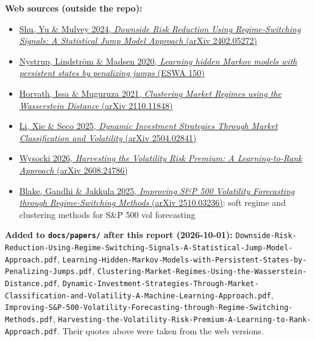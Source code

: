 \documentclass{article}
\begin{document}
\textbf{Web sources (outside the repo):}

\begin{itemize}

\item \href{https://arxiv.org/abs/2402.05272}{Shu, Yu \& Mulvey 2024, \emph{Downside Risk Reduction Using Regime-Switching Signals: A Statistical Jump Model Approach} (arXiv 2402.05272)}

\item \href{https://orbit.dtu.dk/en/publications/learning-hidden-markov-models-with-persistent-states-by-penalizin}{Nystrup, Lindström \& Madsen 2020, \emph{Learning hidden Markov models with persistent states by penalizing jumps} (ESWA 150)}

\item \href{https://arxiv.org/abs/2110.11848}{Horvath, Issa \& Muguruza 2021, \emph{Clustering Market Regimes using the Wasserstein Distance} (arXiv 2110.11848)}

\item \href{https://arxiv.org/abs/2504.02841}{Li, Xie \& Seco 2025, \emph{Dynamic Investment Strategies Through Market Classification and Volatility} (arXiv 2504.02841)}

\item \href{https://arxiv.org/abs/2608.24786}{Wysocki 2026, \emph{Harvesting the Volatility Risk Premium: A Learning-to-Rank Approach} (arXiv 2608.24786)}

\item \href{https://arxiv.org/abs/2510.03236}{Blake, Gandhi \& Jakkula 2025, \emph{Improving S\&P 500 Volatility Forecasting through Regime-Switching Methods} (arXiv 2510.03236)}: soft regime and clustering methods for S\&P 500 vol forecasting

\end{itemize}

\textbf{Added to \texttt{docs/\allowbreak{}papers/\allowbreak{}} after this report (2026-10-01):} \texttt{Downside-\allowbreak{}Risk-\allowbreak{}Reduction-\allowbreak{}Using-\allowbreak{}Regime-\allowbreak{}Switching-\allowbreak{}Signals-\allowbreak{}A-\allowbreak{}Statistical-\allowbreak{}Jump-\allowbreak{}Model-\allowbreak{}Approach.\allowbreak{}pdf}, \texttt{Learning-\allowbreak{}Hidden-\allowbreak{}Markov-\allowbreak{}Models-\allowbreak{}with-\allowbreak{}Persistent-\allowbreak{}States-\allowbreak{}by-\allowbreak{}Penalizing-\allowbreak{}Jumps.\allowbreak{}pdf}, \texttt{Clustering-\allowbreak{}Market-\allowbreak{}Regimes-\allowbreak{}Using-\allowbreak{}the-\allowbreak{}Wasserstein-\allowbreak{}Distance.\allowbreak{}pdf}, \texttt{Dynamic-\allowbreak{}Investment-\allowbreak{}Strategies-\allowbreak{}Through-\allowbreak{}Market-\allowbreak{}Classification-\allowbreak{}and-\allowbreak{}Volatility-\allowbreak{}A-\allowbreak{}Machine-\allowbreak{}Learning-\allowbreak{}Approach.\allowbreak{}pdf}, \texttt{Improving-\allowbreak{}S\&P-\allowbreak{}500-\allowbreak{}Volatility-\allowbreak{}Forecasting-\allowbreak{}through-\allowbreak{}Regime-\allowbreak{}Switching-\allowbreak{}Methods.\allowbreak{}pdf}, \texttt{Harvesting-\allowbreak{}the-\allowbreak{}Volatility-\allowbreak{}Risk-\allowbreak{}Premium-\allowbreak{}A-\allowbreak{}Learning-\allowbreak{}to-\allowbreak{}Rank-\allowbreak{}Approach.\allowbreak{}pdf}. Their quotes above were taken from the web versions.
\end{document}
